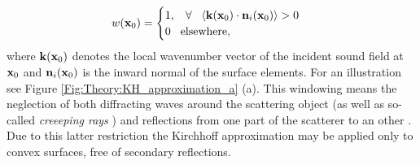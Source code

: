 \begin{itemize}
\begin{equation}
w(\mathbf{x}_0) = \begin{cases}
                        1, \hspace{3mm} \forall \hspace{3mm} \langle \mathbf{k}(\mathbf{x}_0) \cdot \mathbf{n}_i(\mathbf{x}_0) \rangle > 0 \\
                        0  \hspace{3mm} \text{elsewhere},
                    \end{cases}
\label{eq:theory:windowing_function}
\end{equation}
where $\mathbf{k}(\mathbf{x}_0)$ denotes the local wavenumber vector of the incident sound field at $\mathbf{x}_0$ and $ \mathbf{n}_i(\mathbf{x}_0)$ is the inward normal of the surface elements. For an illustration see Figure \ref{Fig:Theory:KH_approximation_a} (a).
%
This windowing means the neglection of both diffracting waves around the scattering object (as well as so-called \emph{creeeping rays} \cite{Bleistein1984}) and reflections from one part of the scatterer to an other \cite{Pignier2015}. 
Due to this latter restriction the Kirchhoff approximation may be applied only to convex surfaces, free of secondary reflections.
%
\end{itemize}

